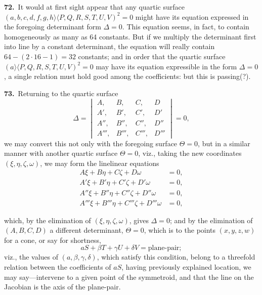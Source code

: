 \documentclass[11pt,a4paper]{article}
\newcommand{\bw}{\mathrel{\rangle\!\langle}}
\begin{document}
\medskip

\textbf{72.}\ It would at first sight appear that any quartic surface $(a, b, c, d, f, g, h \bw P, Q, R, S, T, U, V)^2 = 0$ might have its equation expressed in the foregoing determinant form $\Delta = 0$. This equation seems, in fact, to contain homogeneously as many as 64 constants. But if we multiply the determinant first into line by a constant determinant, the equation will really contain $64 - (2 \cdot 16 - 1) = 32$ constants; and in order that the quartic surface $(a \bw P, Q, R, S, T, U, V)^2 = 0$ may have its equation expressible in the form $\Delta = 0$, a single relation must hold good among the coefficients: but this is passing(?).

\medskip

\textbf{73.}\ Returning to the quartic surface
\[
\Delta = \begin{vmatrix}
A, & B, & C, & D\\
A', & B', & C', & D'\\
A'', & B'', & C'', & D''\\
A''', & B''', & C''', & D'''
\end{vmatrix} = 0,
\]
we may convert this not only with the foregoing surface $\Theta = 0$, but in a similar manner with another quartic surface $\Theta = 0$, viz., taking the new coordinates $(\xi, \eta, \zeta, \omega)$, we may form the linelinear equations
\begin{align*}
A\xi + B\eta + C\zeta + D\omega &= 0,\\
A'\xi + B'\eta + C'\zeta + D'\omega &= 0,\\
A''\xi + B''\eta + C''\zeta + D''\omega &= 0,\\
A'''\xi + B'''\eta + C'''\zeta + D'''\omega &= 0,
\end{align*}

\newpage
\setcounter{page}{161}

\noindent which, by the elimination of $(\xi, \eta, \zeta, \omega)$, gives $\Delta = 0$; and by the elimination of $(A, B, C, D)$ a different determinant, $\Theta = 0$, which is to the points $(x, y, z, w)$ for a cone, or say for shortness,
\[
aS + \beta T + \gamma U + \delta V = \text{plane-pair};
\]
viz., the values of $(a, \beta, \gamma, \delta)$, which satisfy this condition, belong to a threefold relation between the coefficients of $aS$, having previously explained location, we may say---intervene to a given point of the symmetroid, and that the line on the Jacobian is the axis of the plane-pair.
\end{document}
